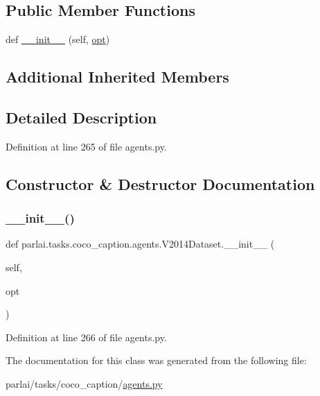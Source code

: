 \subsection*{Public Member Functions}
\begin{DoxyCompactItemize}
\item 
def \hyperlink{classparlai_1_1tasks_1_1coco__caption_1_1agents_1_1V2014Dataset_ab08e77c45352c723e1bab7397473f71f}{\+\_\+\+\_\+init\+\_\+\+\_\+} (self, \hyperlink{classparlai_1_1tasks_1_1coco__caption_1_1agents_1_1DefaultDataset_adaa89b61b63ef4c1291774fda7abaf3c}{opt})
\end{DoxyCompactItemize}
\subsection*{Additional Inherited Members}


\subsection{Detailed Description}


Definition at line 265 of file agents.\+py.



\subsection{Constructor \& Destructor Documentation}
\mbox{\label{classparlai_1_1tasks_1_1coco__caption_1_1agents_1_1V2014Dataset_ab08e77c45352c723e1bab7397473f71f}} 
\subsubsection{\texorpdfstring{\+\_\+\+\_\+init\+\_\+\+\_\+()}{\_\_init\_\_()}}
{\footnotesize\ttfamily def parlai.\+tasks.\+coco\+\_\+caption.\+agents.\+V2014\+Dataset.\+\_\+\+\_\+init\+\_\+\+\_\+ (\begin{DoxyParamCaption}\item[{}]{self,  }\item[{}]{opt }\end{DoxyParamCaption})}



Definition at line 266 of file agents.\+py.



The documentation for this class was generated from the following file\+:\begin{DoxyCompactItemize}
\item 
parlai/tasks/coco\+\_\+caption/\hyperlink{parlai_2tasks_2coco__caption_2agents_8py}{agents.\+py}\end{DoxyCompactItemize}

